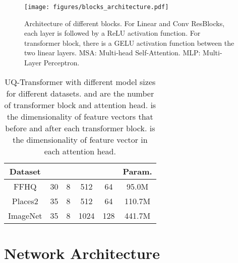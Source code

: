 \documentclass[10pt,twocolumn,letterpaper]{article}
\begin{document}
\begin{figure}[tp]
	\centering
	\texttt{[image: figures/blocks\_architecture.pdf]} 
	\caption{Architecture of different blocks. For Linear and Conv ResBlocks, each layer is followed by a ReLU \cite{nair2010rectified} activation function. For transformer block, there is a GELU \cite{hendrycks2016gaussian} activation function between the two linear layers. MSA: Multi-head Self-Attention. MLP: Multi-Layer Perceptron.}
	\label{figure: blocks_architecture}
\end{figure}



\begin{table}[t]
\footnotesize
\centering
		\begin{tabular}{c|c|c|c|c|c}
			\hline
			Dataset  &  &  &  &  &Param. \\
			\hline 
			FFHQ \cite{karras2019style} & 30 & 8 &512 & 64 &95.0M\\
			Places2 \cite{zhou2017places} & 35 & 8 &512 & 64 &110.7M\\
            ImageNet \cite{deng2009imagenet} & 35 & 8 &1024 & 128 &441.7M\\
			\hline
		\end{tabular}
	\caption{UQ-Transformer with different model sizes for different datasets.  and  are the number of transformer block and attention head.  is the dimensionality of feature vectors that before and after each transformer block.  is the dimensionality of feature vector in each attention head.} 
	\label{tab: different_model_size_of_ut_transformer}
\end{table}	




\section{Network Architecture}
\label{sec: network_architecture}
\end{document}
